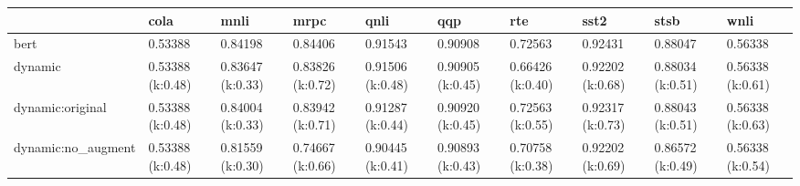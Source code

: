 \begin{tabular}{llllllllll}
\toprule
{} &              cola &              mnli &              mrpc &              qnli &               qqp &               rte &              sst2 &              stsb &              wnli \\
\midrule
bert               &           0.53388 &           0.84198 &           0.84406 &           0.91543 &           0.90908 &           0.72563 &           0.92431 &           0.88047 &           0.56338 \\
dynamic            &  0.53388 (k:0.48) &  0.83647 (k:0.33) &  0.83826 (k:0.72) &  0.91506 (k:0.48) &  0.90905 (k:0.45) &  0.66426 (k:0.40) &  0.92202 (k:0.68) &  0.88034 (k:0.51) &  0.56338 (k:0.61) \\
dynamic:original   &  0.53388 (k:0.48) &  0.84004 (k:0.33) &  0.83942 (k:0.71) &  0.91287 (k:0.44) &  0.90920 (k:0.45) &  0.72563 (k:0.55) &  0.92317 (k:0.73) &  0.88043 (k:0.51) &  0.56338 (k:0.63) \\
dynamic:no\_augment &  0.53388 (k:0.48) &  0.81559 (k:0.30) &  0.74667 (k:0.66) &  0.90445 (k:0.41) &  0.90893 (k:0.43) &  0.70758 (k:0.38) &  0.92202 (k:0.69) &  0.86572 (k:0.49) &  0.56338 (k:0.54) \\
\bottomrule
\end{tabular}
